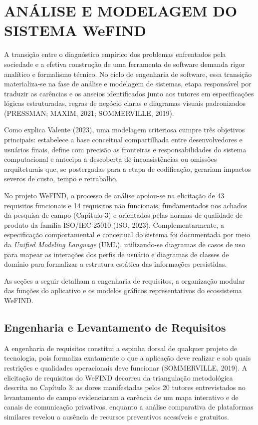 \section{ANÁLISE E MODELAGEM DO SISTEMA WeFIND}

A transição entre o diagnóstico empírico dos problemas enfrentados pela sociedade e a efetiva construção de uma ferramenta de software demanda rigor analítico e formalismo técnico. No ciclo de engenharia de software, essa transição materializa-se na fase de análise e modelagem de sistemas, etapa responsável por traduzir as carências e os anseios identificados junto aos tutores em especificações lógicas estruturadas, regras de negócio claras e diagramas visuais padronizados (PRESSMAN; MAXIM, 2021; SOMMERVILLE, 2019).

Como explica Valente (2023), uma modelagem criteriosa cumpre três objetivos principais: estabelece a base conceitual compartilhada entre desenvolvedores e usuários finais, define com precisão as fronteiras e responsabilidades do sistema computacional e antecipa a descoberta de inconsistências ou omissões arquiteturais que, se postergadas para a etapa de codificação, gerariam impactos severos de custo, tempo e retrabalho.

No projeto WeFIND, o processo de análise apoiou-se na elicitação de 43 requisitos funcionais e 14 requisitos não funcionais, fundamentados nos achados da pesquisa de campo (Capítulo 3) e orientados pelas normas de qualidade de produto da família ISO/IEC 25010 (ISO, 2023). Complementarmente, a especificação comportamental e conceitual do sistema foi documentada por meio da \textit{Unified Modeling Language} (UML), utilizando-se diagramas de casos de uso para mapear as interações dos perfis de usuário e diagramas de classes de domínio para formalizar a estrutura estática das informações persistidas.

As seções a seguir detalham a engenharia de requisitos, a organização modular das funções do aplicativo e os modelos gráficos representativos do ecossistema WeFIND.

\clearpage

\subsection{Engenharia e Levantamento de Requisitos}

A engenharia de requisitos constitui a espinha dorsal de qualquer projeto de tecnologia, pois formaliza exatamente o que a aplicação deve realizar e sob quais restrições e qualidades operacionais deve funcionar (SOMMERVILLE, 2019). A elicitação de requisitos do WeFIND decorreu da triangulação metodológica descrita no Capítulo 3: as dores manifestadas pelos 20 tutores entrevistados no levantamento de campo evidenciaram a carência de um mapa interativo e de canais de comunicação privativos, enquanto a análise comparativa de plataformas similares revelou a ausência de recursos preventivos acessíveis e gratuitos.

